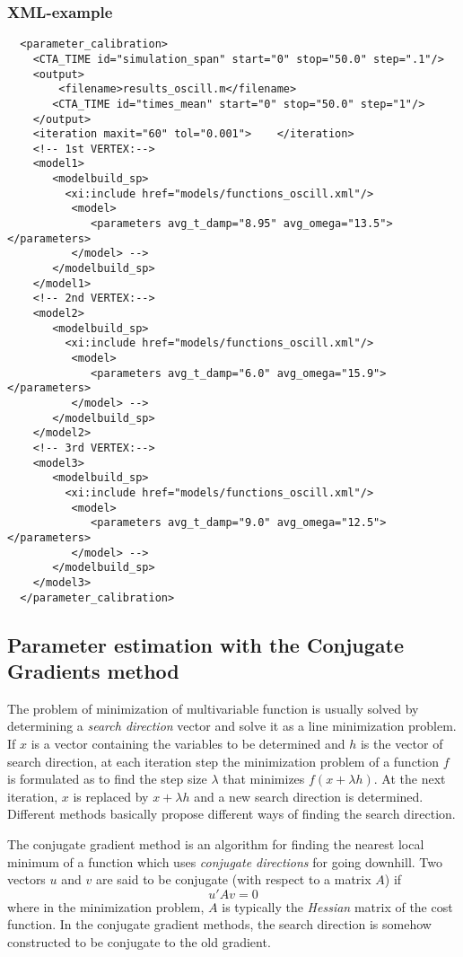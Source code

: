 \documentclass[a4paper,12pt]{article}
\begin{document}
\subsubsection{XML-example}

\begin{verbatim}
  <parameter_calibration>
    <CTA_TIME id="simulation_span" start="0" stop="50.0" step=".1"/>
    <output>
        <filename>results_oscill.m</filename> 
       <CTA_TIME id="times_mean" start="0" stop="50.0" step="1"/>
    </output>
    <iteration maxit="60" tol="0.001">    </iteration>
    <!-- 1st VERTEX:-->
    <model1>
       <modelbuild_sp>
         <xi:include href="models/functions_oscill.xml"/>
          <model>  
             <parameters avg_t_damp="8.95" avg_omega="13.5"> </parameters> 
          </model> -->  
       </modelbuild_sp> 
    </model1>
    <!-- 2nd VERTEX:-->
    <model2>
       <modelbuild_sp>
         <xi:include href="models/functions_oscill.xml"/>
          <model>  
             <parameters avg_t_damp="6.0" avg_omega="15.9"> </parameters> 
          </model> -->  
       </modelbuild_sp> 
    </model2>
    <!-- 3rd VERTEX:-->
    <model3>
       <modelbuild_sp>
         <xi:include href="models/functions_oscill.xml"/>
          <model>  
             <parameters avg_t_damp="9.0" avg_omega="12.5"> </parameters> 
          </model> -->  
       </modelbuild_sp> 
    </model3>
  </parameter_calibration>
\end{verbatim}

\subsection{Parameter estimation with the Conjugate Gradients method}
\label{sssec.conjugrad}
The problem of minimization of multivariable function is usually solved by
determining a \emph{search direction} vector and solve it as a line
minimization problem. If $x$ is a vector containing the variables to be
determined and $h$ is the vector of search direction, at each iteration
step the minimization problem of a function $f$ is formulated as to find
the step size $\lambda$ that minimizes $f(x+\lambda h)$. At the next
iteration, $x$ is replaced by $x+\lambda h$ and a new search direction is
determined. Different methods basically propose different ways of finding
the search direction.

The conjugate gradient method is an algorithm for finding the nearest local
minimum of a function which uses \emph{conjugate directions} for going
downhill. Two vectors $u$ and $v$ are said to be conjugate (with respect to
a matrix $A$) if
\begin{equation}
   u'Av=0
\end{equation}
where in the minimization problem, $A$ is typically the \emph{Hessian}
matrix of the cost function. In the conjugate gradient methods, the search
direction is somehow constructed to be conjugate to the old gradient.
\end{document}
